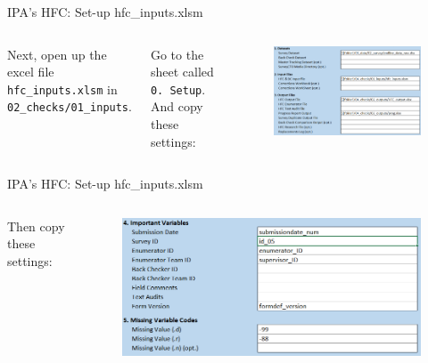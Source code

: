 \documentclass[aspectratio=169]{beamer}
\begin{document}
\begin{frame}{IPA's HFC: Set-up hfc\_inputs.xlsm}
	
	\begin{columns}[c]
		
		\small Next, open up the excel file \texttt{hfc\_inputs.xlsm} in \texttt{02\_checks/01\_inputs}. 
		
		\vspace{.2cm}
		
		Go to the sheet called \texttt{0. Setup}. And copy these settings:
		
		\begin{figure}
			\centering
			\includegraphics[width=\linewidth]{img/ipacheck-setup-1.png}
		\end{figure}
	\end{columns}
\end{frame}


\begin{frame}{IPA's HFC: Set-up hfc\_inputs.xlsm}
	\begin{columns}[c]
		
		\column{.22\linewidth}
		\small Then copy these settings:
		
		\column{.78\linewidth}
		\begin{figure}
			\centering
			\includegraphics[width=\linewidth]{img/ipacheck-setup-2.png}
		\end{figure}
	\end{columns}
\end{frame}
\end{document}
